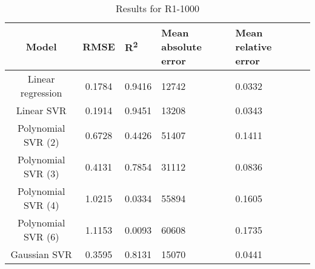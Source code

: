 \begin{table}[H]
\centering
\begin{adjustbox}{center}
\begin{tabular}{c | c M{1.2cm} M{2.5cm} M{2.5cm} M{1.8cm}}
Model & RMSE & R\textsuperscript{2} & Mean absolute error & Mean relative error \tabularnewline
\hline
Linear regression & 0.1784 & 0.9416 &  12742 & 0.0332 \\
Linear SVR & 0.1914 & 0.9451 &  13208 & 0.0343 \\
Polynomial SVR (2) & 0.6728 & 0.4426 &  51407 & 0.1411 \\
Polynomial SVR (3) & 0.4131 & 0.7854 &  31112 & 0.0836 \\
Polynomial SVR (4) & 1.0215 & 0.0334 &  55894 & 0.1605 \\
Polynomial SVR (6) & 1.1153 & 0.0093 &  60608 & 0.1735 \\
Gaussian SVR & 0.3595 & 0.8131 &  15070 & 0.0441 \\
\end{tabular}
\end{adjustbox}
\\
\caption{Results for R1-1000}
\label{tab:coreonly_linear_R1_1000}
\end{table}
